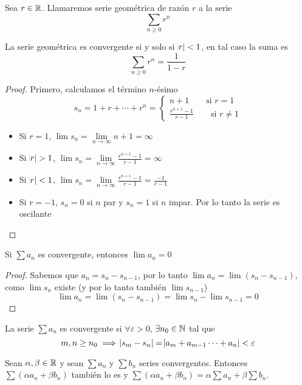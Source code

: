 \begin{defi}
	Sea $r \in \mathbb{R}$. Llamaremos serie geométrica de razón $r$ a la serie
	\[
		\sum_{n \geq 0} r^n
	\]
\end{defi}

\begin{prop*}
	La serie geométrica es convergente si y solo si $\abs{r} < 1$, en tal caso
	la suma es
	\[
		\sum_{n \geq 0} r^n = \frac{1}{1-r}
	\]
\end{prop*}

\begin{proof}
	Primero, calculamos el término $n$-ésimo
	\[
		s_n = 1 + r + \cdots + r^n = \begin{cases}
			n+1 \qquad \text{si } r = 1 \\
			\frac{r^{n+1} - 1 }{r-1} \qquad \text{si } r \neq 1
		\end{cases}
	\]
	\begin{itemize}
		\item Si $r = 1$, $\lim s_n = \lim\limits_{n  \to \infty} n+1 = \infty$
		\item Si $\abs{r} > 1$, $\lim s_n = \lim\limits_{n \to \infty}
			\frac{r^{n+1} - 1}{r-1} = \infty$
		\item Si $\abs{r} < 1$, $\lim s_n = \lim\limits_{n \to \infty}
			\frac{r^{n+1} - 1}{r-1} = \frac{-1}{r-1}$
		\item Si $r = -1$, $s_n = 0$ si $n$ par y $s_n = 1$ si $n$ impar. Por
			lo tanto la serie es oscilante
	\end{itemize}
\end{proof}

\begin{prop}
	Si $\sum a_n$ es convergente, entonces $\lim a_n = 0$
\end{prop}

\begin{proof}
	Sabemos que $a_n = s_n - s_{n-1}$, por lo tanto
	$\lim a_n = \lim (s_n - s_{n-1})$, como $\lim s_n$ existe (y por lo tanto
	también $\lim s_{n-1}$)
	\[
		\lim a_n = \lim (s_n - s_{n-1}) = \lim s_n - \lim s_{n-1} = 0
	\]
\end{proof}

\begin{prop}
	La serie $\sum a_n$ es convergente si $\forall\varepsilon>0$,
	$\exists n_0 \in \mathbb{N}$
	tal que
	\[
		m,n \geq n_0 \implies \abs{s_m - s_n} = \abs{a_m + a_{m-1} \cdots + a_n} <
		\varepsilon
	\]
\end{prop}

\begin{prop}[linealidad]
	Sean $\alpha, \beta \in \mathbb{R}$ y sean $\sum a_n$ y $\sum b_n$ series convergentes.
	Entonces $\sum (\alpha a_n + \beta b_n)$ también lo es y $\sum (\alpha a_n + \beta b_n)
	= \alpha \sum a_n + \beta \sum b_n$.
\end{prop}

